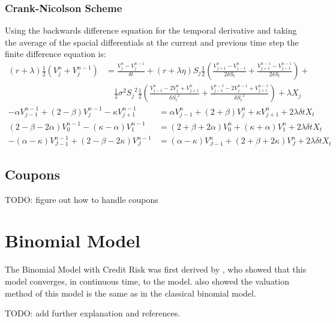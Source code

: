 \documentclass[a4paper,11pt,oneside]{report}
\theoremstyle{plain}
\theoremstyle{definition}
\def\DS{\ensuremath{\delta S_t}\xspace}
\def\Dt{\ensuremath{\delta t}\xspace}
\def\Vjn{\ensuremath{V^{n}_j}\xspace}
\def\Vjnm{\ensuremath{V^{n - 1}_j}\xspace}
\def\Vjmn{\ensuremath{V^{n}_{j - 1}}\xspace}
\def\Vjpn{\ensuremath{V^{n}_{j + 1}}\xspace}
\def\Vjmnm{\ensuremath{V^{n - 1}_{j - 1}}\xspace}
\def\Vjpnm{\ensuremath{V^{n - 1}_{j + 1}}\xspace}
\def\Von{\ensuremath{V^{n}_{0}\xspace}}
\def\Vopn{\ensuremath{V^{n}_{1}\xspace}}
\def\VJn{\ensuremath{V^{n}_{J}\xspace}}
\def\VJmn{\ensuremath{V^{n}_{J - 1}\xspace}}
\def\Vonm{\ensuremath{V^{n - 1}_{0}\xspace}}
\def\Vopnm{\ensuremath{V^{n - 1}_{1}\xspace}}
\def\VJnm{\ensuremath{V^{n - 1}_{J}\xspace}}
\def\VJmnm{\ensuremath{V^{n - 1}_{J - 1}\xspace}}
\def\Sj{\ensuremath{S_j}\xspace}
\def\Xj{\ensuremath{X_j}\xspace}
\def\X{\ensuremath{X_t}\xspace}
\def\half{\tfrac{1}{2}}
\begin{document}
\subsection{Crank-Nicolson Scheme}
Using the backwards difference equation for the temporal derivative and taking the average of the spacial differentials at the current and previous time step the finite difference equation is:
\small\begin{align*}
 (r + \lambda)\half(\Vjn + \Vjnm) &= \frac{\Vjn - \Vjnm}{\Dt} + (r + \lambda\eta)\Sj\frac{1}{2}\left(\frac{\Vjpn - \Vjmn}{2\DS} + \frac{\Vjpnm - \Vjmnm}{2\DS}\right) + \\
  &\quad \half\sigma^2\Sj^2\frac{1}{2}\left(\frac{\Vjmn - 2\Vjn + \Vjpn}{\DS^2} + \frac{\Vjmnm - 2\Vjnm + \Vjpnm}{\DS^2}\right) + \lambda\Xj
\end{align*}
\begin{align}
 -\alpha\Vjmnm + (2 - \beta)\Vjnm - \kappa\Vjpnm &= \alpha\Vjmn + (2 + \beta)\Vjn + \kappa\Vjpn + 2\lambda\Dt\X \\
 (2 - \beta - 2\alpha)\Vonm - (\kappa - \alpha)\Vopnm &= (2 + \beta + 2\alpha)\Von + (\kappa + \alpha)\Vopn + 2\lambda\Dt\X \\
 -(\alpha - \kappa)\VJmnm + (2 - \beta - 2\kappa)\VJnm &= (\alpha - \kappa)\VJmn + (2 + \beta + 2\kappa)\VJn + 2\lambda\Dt\X
\end{align}\normalsize


\section{Coupons}
TODO: figure out how to handle coupons


\chapter{Binomial Model}
The Binomial Model with Credit Risk was first derived by \citet{MK12}, who showed that this model converges, in continuous time, to the \citet{AFV03} model.   also showed the valuation method of this model is the same as in the classical binomial model.

TODO: add further explanation and references.

\end{document}
